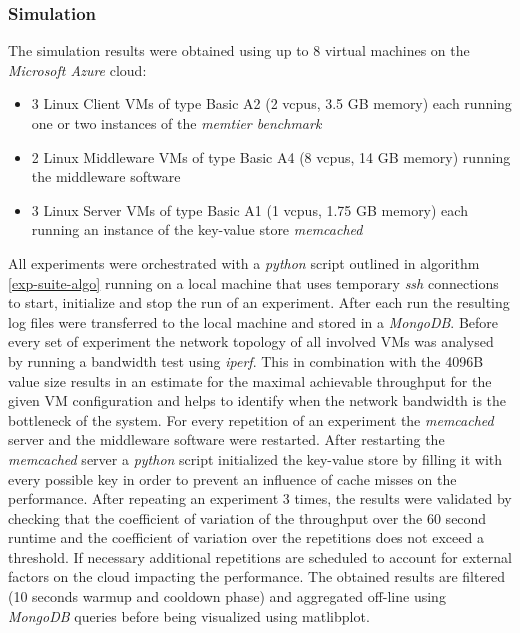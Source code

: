\documentclass[report.tex]{subfiles}
\begin{document}
\subsubsection{Simulation}\label{simulation}

The simulation results were obtained using up to 8 virtual machines on the \emph{Microsoft Azure} cloud:
\begin{itemize}
	\vitemsep
	\item 3 Linux Client VMs of type Basic A2 (2 vcpus, 3.5 GB memory) each running one or two instances of the \emph{memtier benchmark}
	\item 2 Linux Middleware VMs of type Basic A4 (8 vcpus, 14 GB memory) running the middleware software
	\item 3 Linux Server VMs of type Basic A1 (1 vcpus, 1.75 GB memory) each running an instance of the key-value store \emph{memcached} 
\end{itemize}

All experiments were orchestrated with a \emph{python} script outlined in algorithm \ref{exp-suite-algo} running on a local machine that uses temporary \emph{ssh} connections to start, initialize and stop the run of an experiment. After each run  the resulting log files were transferred to the local machine and stored in a \emph{MongoDB}.
Before every set of experiment the network topology of all involved VMs was analysed by running a bandwidth test using \emph{iperf}. This in combination with the 4096B value size results in an estimate for the maximal achievable throughput for the given VM configuration and helps to identify when the network bandwidth is the bottleneck of the system.
For every repetition of an experiment the \emph{memcached} server and the middleware software were restarted. After restarting the \emph{memcached} server a \emph{python} script initialized the key-value store by filling it with every possible key in order to prevent an influence of cache misses on the performance. 
After repeating an experiment 3 times, the results were validated by checking that the coefficient of variation of the throughput over the 60 second runtime and the coefficient of variation over the repetitions does not exceed a threshold. If necessary additional repetitions are scheduled to account for external factors on the cloud impacting the performance.
The obtained results are filtered (10 seconds warmup and cooldown phase) and aggregated off-line using \emph{MongoDB} queries before being visualized using matlibplot.
\end{document}
